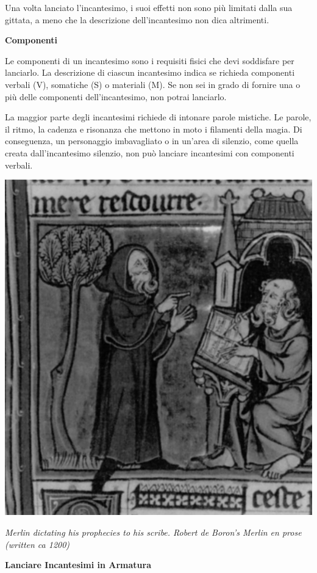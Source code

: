 \begin{multicols}{2}
Una volta lanciato l'incantesimo, i suoi effetti non sono più limitati dalla sua gittata, a meno che la descrizione dell'incantesimo non dica altrimenti.

\medskip

\textbf{Componenti}

Le componenti di un incantesimo sono i requisiti fisici che devi soddisfare per lanciarlo. La descrizione di ciascun incantesimo indica se richieda componenti verbali (V), somatiche (S) o materiali (M). Se non sei in grado di fornire una o più delle componenti dell'incantesimo, non potrai lanciarlo.

La maggior parte degli incantesimi richiede di intonare parole mistiche. Le parole, il ritmo, la cadenza e risonanza che mettono in moto i filamenti della magia. Di conseguenza, un personaggio imbavagliato o in un'area di silenzio, come quella creata dall'incantesimo silenzio, non può lanciare incantesimi con componenti verbali.

\medskip

\begin{center}
	\includegraphics[width=0.8\linewidth]{immagini/merlin.png}
	
	\textit{Merlin dictating his prophecies to his scribe. Robert de Boron's Merlin en prose (written ca 1200)}
\end{center}

\medskip

\textbf{Lanciare Incantesimi in Armatura}


\end{multicols}
